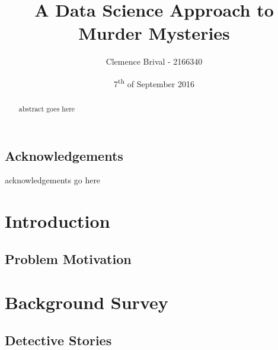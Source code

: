 \documentclass{mproj}
\begin{document}
\title{A Data Science Approach to Murder Mysteries}
\author{Clemence Brival - 2166340}
\date{7\textsuperscript{th} of September 2016}
\maketitle


\begin{abstract}
abstract goes here
\end{abstract}

\educationalconsent


\newpage
\section*{Acknowledgements}

acknowledgements go here


\tableofcontents


\chapter{Introduction}\label{intro}

\section{Problem Motivation}


\chapter{Background Survey}\label{survey}


\section{Detective Stories}
\end{document}

